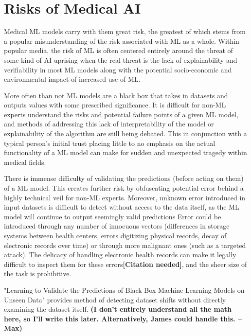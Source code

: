 \documentclass[]{article}
\begin{document}
	\section{Risks of Medical AI}
		Medical ML models carry with them great risk, the greatest of which stems from a popular misunderstanding of the risk associated with ML as a whole. Within popular media, the risk of ML is often centered entirely around the threat of some kind of AI uprising when the real threat is the lack of explainability and verifiability in most ML models along with the potential socio-economic and environmental impact of increased use of ML.\cite{bbc2016rroai,emerj2019roawrtiwwa}

		More often than not ML models are a black box that takes in datasets and outputs values with some prescribed significance. It is difficult for non-ML experts understand the risks and potential failure points of a given ML model, and methods of addressing this lack of interpretability of the model or explainability of the algorithm are still being debated.\cite{10.1145/2858036.2858529, 10.1145/3328519.3329126} This in conjunction with a typical person's initial trust placing little to no emphasis on the actual functionality of a ML model\cite{siau2018building} can make for sudden and unexpected tragedy within medical fields.

		There is immense difficulty of validating the predictions (before acting on them) of a ML model. This creates further risk by obfuscating potential error behind a highly technical veil for non-ML experts. Moreover, unknown error introduced in input datasets is difficult to detect without access to the data itself, as the ML model will continue to output seemingly valid predictions\cite{10.1145/3328519.3329126} Error could be introduced through any number of innocuous vectors (differences in storage systems between health centers, errors digitizing physical records, decay of electronic records over time) or through more malignant ones (such as a targeted attack). The delicacy of handling electronic health records can make it legally difficult to inspect them for these errors\textbf{[Citation needed]}, and the sheer size of the task is prohibitive.

		"Learning to Validate the Predictions of Black Box Machine Learning Models on Unseen Data"\cite{10.1145/3328519.3329126} provides method of detecting dataset shifts without directly examining the dataset itself. \textbf{(I don't entirely understand all the math here, so I'll write this later. Alternatively, James could handle this. --Max)}
\end{document}
